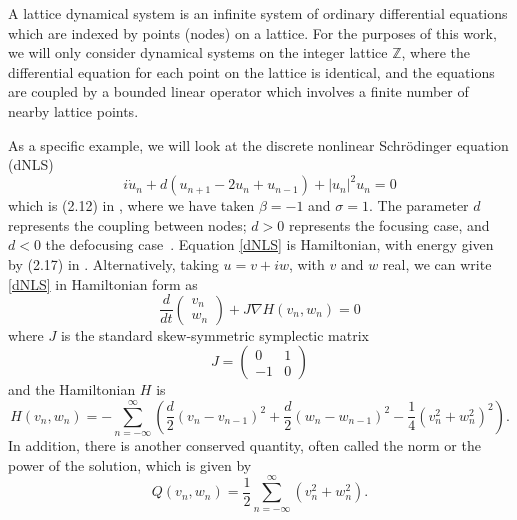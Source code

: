 \documentclass[12pt]{article}
\def\Z{{\mathbb Z}}
\begin{document}
A lattice dynamical system is an infinite system of ordinary differential equations which are indexed by points (nodes)
on a lattice. For the purposes of this work, we will only consider dynamical systems on the integer lattice $\Z$, where the differential equation for each point on the lattice is identical, and the equations are coupled by a bounded linear operator which involves a finite number of nearby lattice points.

As a specific example, we will look at the discrete nonlinear Schr{\"o}dinger equation (dNLS)
\begin{equation}\label{dNLS}
i\dot{u}_n + d(u_{n+1} - 2 u_n + u_{n-1}) + |u_n|^2 u_n = 0
\end{equation}
which is (2.12) in \cite{Kevrekidis2009}, where we have taken $\beta = -1$ and $\sigma = 1$. The parameter $d$ represents the coupling between nodes; $d > 0$ represents the focusing case, and $d < 0$ the defocusing case~\cite{Kevrekidis2009}. Equation \eqref{dNLS} is Hamiltonian, with energy given by (2.17) in \cite{Kevrekidis2009,pelinovsky_2011}. Alternatively, taking $u = v + i w$, with $v$ and $w$ real, we can write \eqref{dNLS} in Hamiltonian form as
\begin{equation}\label{dNLSrealHam}
\frac{d}{dt}\begin{pmatrix}v_n \\ w_n\end{pmatrix}
+ J \nabla H(v_n, w_n) = 0
\end{equation}
where $J$ is the standard skew-symmetric symplectic matrix
\[
J = \begin{pmatrix}0 & 1 \\ -1 & 0\end{pmatrix}
\]
and the Hamiltonian $H$ is
\begin{equation}\label{dNLSrealH}
H(v_n, w_n) = -\sum_{n = -\infty}^\infty 
\left( \frac{d}{2}\left(v_n - v_{n-1}\right)^2 + \frac{d}{2}\left(w_n - w_{n-1}\right)^2 - \frac{1}{4}\left( v_n^2 + w_n^2 \right)^2 \right).
\end{equation}
In addition, there is another conserved quantity, often called the norm or the power of the solution, which is given by
\begin{equation}\label{dNLSQ}
Q(v_n, w_n) = \frac{1}{2} \sum_{n = -\infty}^\infty 
\left( v_n^2 + w_n ^2\right).
\end{equation}
\end{document}
